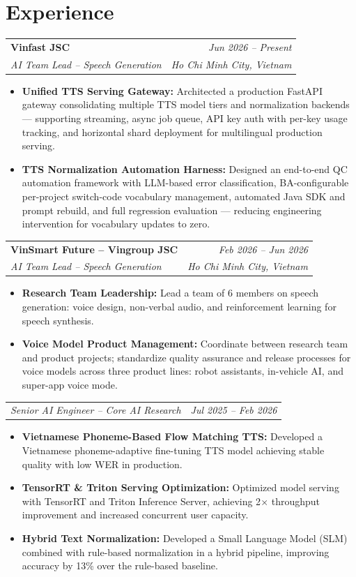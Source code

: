 \documentclass[10pt,a4paper]{article}
\makeatletter
\newcommand{\cventry}[4]{%
  \noindent
  \begin{tabular*}{\linewidth}{@{}l@{\extracolsep{\fill}}r@{}}
    {\color{accent}\textbf{#1}} & \textit{\small #2} \\
    \textit{\small #3} & \textit{\small #4}
  \end{tabular*}%
  \vspace{1pt}%
}
\newcommand{\cvsubrole}[2]{%
  \noindent
  \begin{tabular*}{\linewidth}{@{}l@{\extracolsep{\fill}}r@{}}
    \textit{\small #1} & \textit{\small #2}
  \end{tabular*}%
  \vspace{1pt}%
}
\makeatother
\begin{document}
\section{Experience}

\cventry{Vinfast JSC}{Jun 2026 -- Present}
        {AI Team Lead -- Speech Generation}{Ho Chi Minh City, Vietnam}
\begin{itemize}
  \item \textbf{Unified TTS Serving Gateway:} Architected a production FastAPI gateway consolidating multiple TTS model tiers and normalization backends — supporting streaming, async job queue, API key auth with per-key usage tracking, and horizontal shard deployment for multilingual production serving.
  \item \textbf{TTS Normalization Automation Harness:} Designed an end-to-end QC automation framework with LLM-based error classification, BA-configurable per-project switch-code vocabulary management, automated Java SDK and prompt rebuild, and full regression evaluation — reducing engineering intervention for vocabulary updates to zero.
\end{itemize}

\vspace{4pt}

\cventry{VinSmart Future -- Vingroup JSC}{Feb 2026 -- Jun 2026}
        {AI Team Lead -- Speech Generation}{Ho Chi Minh City, Vietnam}
\begin{itemize}
  \item \textbf{Research Team Leadership:} Lead a team of 6 members on speech generation: voice design, non-verbal audio, and reinforcement learning for speech synthesis.
  \item \textbf{Voice Model Product Management:} Coordinate between research team and product projects; standardize quality assurance and release processes for voice models across three product lines: robot assistants, in-vehicle AI, and super-app voice mode.
\end{itemize}

\vspace{2pt}
\cvsubrole{Senior AI Engineer -- Core AI Research}{Jul 2025 -- Feb 2026}
\begin{itemize}
  \item \textbf{Vietnamese Phoneme-Based Flow Matching TTS:} Developed a Vietnamese phoneme-adaptive fine-tuning TTS model achieving stable quality with low WER in production.
  \item \textbf{TensorRT \& Triton Serving Optimization:} Optimized model serving with TensorRT and Triton Inference Server, achieving 2$\times$ throughput improvement and increased concurrent user capacity.
  \item \textbf{Hybrid Text Normalization:} Developed a Small Language Model (SLM) combined with rule-based normalization in a hybrid pipeline, improving accuracy by 13\% over the rule-based baseline.
\end{itemize}
\end{document}
